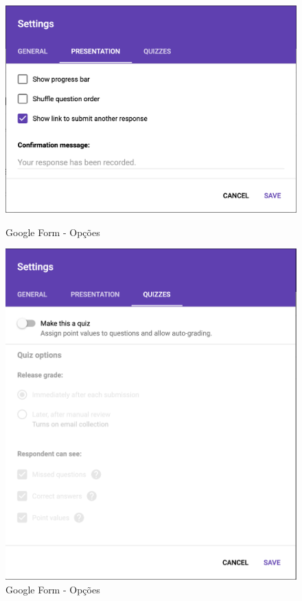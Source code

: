 \begin{figure}[ht!]
	\begin{center}
		\begin{minipage}{0.40\textwidth}
			\begin{center}
				\includegraphics[height=.22\textheight]{img/gf/gf-form-set2}
				\caption{Google Form - Opções}
				\label{fig:gf-form-set2}
			\end{center}
		\end{minipage}
		\hspace{2cm}
		\begin{minipage}{0.40\textwidth}
			\begin{center}
				\includegraphics[height=.30\textheight]{img/gf/gf-form-set3}
				\caption{Google Form - Opções}
				\label{fig:gf-form-set3}
			\end{center}
		\end{minipage}
	\end{center}
\end{figure}

